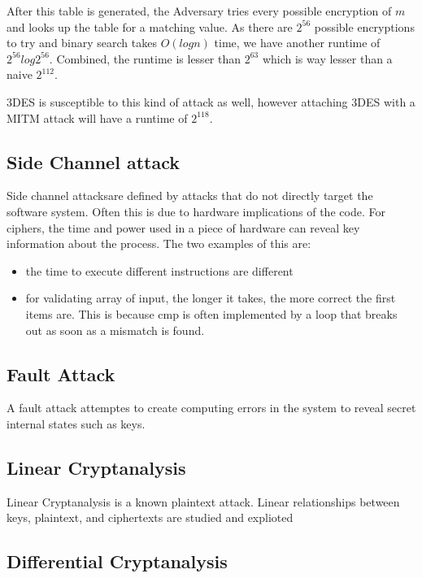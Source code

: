 \documentclass{article}
\begin{document}
\begin{multicols}{2}
After this table is generated, the Adversary tries every possible encryption of $m$ and looks up the table for a matching value. As there are $2^{56}$ possible encryptions to try and binary search takes $O(logn)$ time, we have another runtime of $2^{56}log2^{56}$. Combined, the runtime is lesser than $2^{63}$ which is way lesser than a naive $2^{112}$. 

3DES is susceptible to this kind of attack as well, however attaching 3DES with a MITM attack will have a runtime of $2^{118}$.

\subsection{Side Channel attack}

Side channel attacksare defined by attacks that do not directly target the software system. Often this is due to hardware implications of the code. For ciphers, the time and power used in a piece of hardware can reveal key information about the process. The two examples of this are:

\begin{itemize}
    \item the time to execute different instructions are different
    \item for validating array of input, the longer it takes, the more correct the first items are. This is because cmp is often implemented by a loop that breaks out as soon as a mismatch is found.
\end{itemize}

\subsection{Fault Attack}

A fault attack attemptes to create computing errors in the system to reveal secret internal states such as keys.

\subsection{Linear Cryptanalysis}

Linear Cryptanalysis is a known plaintext attack. Linear relationships between keys, plaintext, and ciphertexts are studied and explioted

\subsection{Differential Cryptanalysis}


\end{multicols}
\end{document}
